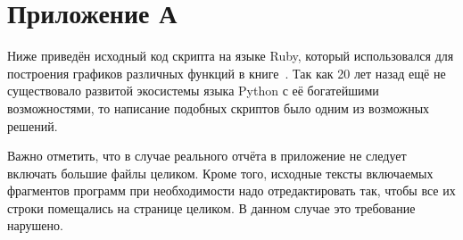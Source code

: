 \section{Приложение А}

Ниже приведён исходный код скрипта на языке Ruby, который использовался для
построения графиков различных функций в книге~\cite{roganov-jurists}.
Так как 20 лет назад ещё не существовало развитой экосистемы языка Python
с её богатейшими возможностями, то написание подобных скриптов было одним
из возможных решений.

Важно отметить, что в случае реального отчёта в приложение не следует включать
большие файлы целиком. Кроме того, исходные тексты включаемых фрагментов
программ при необходимости надо отредактировать так, чтобы все их строки
помещались на странице целиком. В данном случае это требование нарушено.

\begin{scriptsize}

\end{scriptsize}

